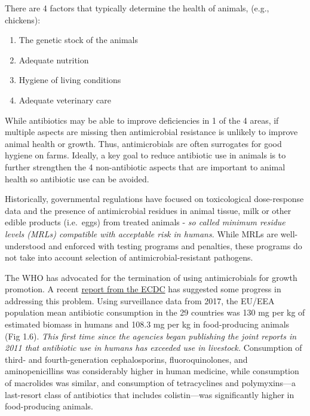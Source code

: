\documentclass[
]{book}
\providecommand{\tightlist}{%
  \setlength{\itemsep}{0pt}\setlength{\parskip}{0pt}}
\begin{document}
There are 4 factors that typically determine the health of animals, (e.g., chickens):

\begin{enumerate}
\def\labelenumi{\arabic{enumi}.}
\tightlist
\item
  The genetic stock of the animals
\item
  Adequate nutrition
\item
  Hygiene of living conditions
\item
  Adequate veterinary care
\end{enumerate}

While antibiotics may be able to improve deficiencies in 1 of the 4 areas, if multiple aspects are missing then antimicrobial resistance is unlikely to improve animal health or growth. Thus, antimicrobials are often surrogates for good hygiene on farms. Ideally, a key goal to reduce antibiotic use in animals is to further strengthen the 4 non-antibiotic aspects that are important to animal health so antibiotic use can be avoided.

Historically, governmental regulations have focused on toxicological dose-response data and the presence of antimicrobial residues in animal tissue, milk or other edible products (i.e.~eggs) from treated animals - \emph{so called minimum residue levels (MRLs) compatible with acceptable risk in humans.} While MRLs are well-understood and enforced with testing programs and penalties, these programs do not take into account selection of antimicrobial-resistant pathogens.

The WHO has advocated for the termination of using antimicrobials for growth promotion. A recent \href{https://www.ecdc.europa.eu/sites/default/files/documents/JIACRA-III-Antimicrobial-Consumption-and-Resistance-in-Bacteria-from-Humans-and-Animals.pdf}{report from the ECDC} has suggested some progress in addressing this problem. Using surveillance data from 2017, the EU/EEA population mean antibiotic consumption in the 29 countries was 130 mg per kg of estimated biomass in humans and 108.3 mg per kg in food-producing animals (Fig 1.6). \emph{This first time since the agencies began publishing the joint reports in 2011 that antibiotic use in humans has exceeded use in livestock.} Consumption of third- and fourth-generation cephalosporins, fluoroquinolones, and aminopenicillins was considerably higher in human medicine, while consumption of macrolides was similar, and consumption of tetracyclines and polymyxins---a last-resort class of antibiotics that includes colistin---was significantly higher in food-producing animals.
\end{document}
